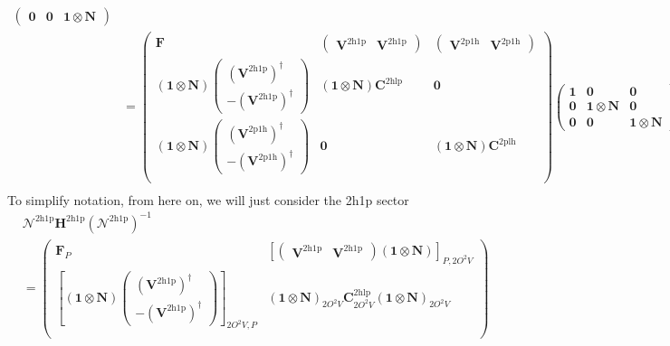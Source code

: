 \begin{align}
\begin{pmatrix}
\bm{0} & \bm{0} & \bm{1} \otimes \bm{N}
\end{pmatrix} \\
&=
\begin{pmatrix}
\bm{F} & \begin{pmatrix} \bm{V}^{2\mathrm{h1p}} & \bm{V}^{2\mathrm{h1p}} \end{pmatrix} & \begin{pmatrix} \bm{V}^{2\mathrm{p1h}} & \bm{V}^{2\mathrm{p1h}} \end{pmatrix} \\
\left(\bm{1}\otimes \bm{N}\right)\begin{pmatrix} \left(\bm{V}^{2\mathrm{h1p}}\right)^{\dagger} \\ -\left(\bm{V}^{2\mathrm{h1p}}\right)^{\dagger} \end{pmatrix} & \left(\bm{1}\otimes \bm{N}\right)\bm{C}^{2\mathrm{hlp}} & \bm{0} \\
\left(\bm{1}\otimes \bm{N}\right)\begin{pmatrix} \left(\bm{V}^{2\mathrm{p1h}}\right)^{\dagger} \\ -\left(\bm{V}^{2\mathrm{p1h}}\right)^{\dagger} \end{pmatrix} & \bm{0} & \left(\bm{1}\otimes \bm{N}\right)\bm{C}^{2\mathrm{plh}} \\
\end{pmatrix}
\begin{pmatrix}
\bm{1} & \bm{0} & \bm{0} \\
\bm{0} & \bm{1} \otimes \bm{N} & \bm{0} \\
\bm{0} & \bm{0} & \bm{1} \otimes \bm{N}
\end{pmatrix} \\
\end{align}
To simplify notation, from here on, we will just consider the 2h1p sector
\begin{align}
&\bm{\mathcal{N}}^{2\mathrm{h1p}} \bm{H}^{2\mathrm{h1p}} \left(\bm{\mathcal{N}}^{2\mathrm{h1p}}\right)^{-1} \\
&= \begin{pmatrix}
\bm{F}_{P} & 
    \left[\begin{pmatrix} 
        \bm{V}^{2\mathrm{h1p}} & \bm{V}^{2\mathrm{h1p}}
    \end{pmatrix}  \left(\bm{1}\otimes \bm{N}\right)\right]_{P,2O^2V}  \\[1em]
\left[\left(\bm{1}\otimes \bm{N}\right)
    \begin{pmatrix} 
        \left(\bm{V}^{2\mathrm{h1p}}\right)^{\dagger} \\ 
        -\left(\bm{V}^{2\mathrm{h1p}}\right)^{\dagger} 
    \end{pmatrix}\right]_{2O^2V,P} & 
    \left(\bm{1}\otimes \bm{N}\right)_{2O^2V}\bm{C}^{2\mathrm{hlp}}_{2O^2V}\left(\bm{1}\otimes \bm{N}\right)_{2O^2V} \\
\end{pmatrix}
\end{align}
